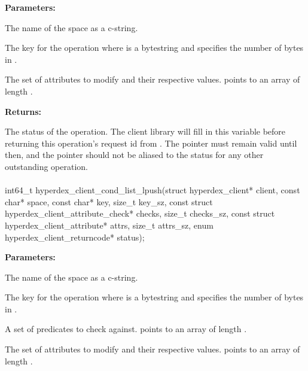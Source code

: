\noindent\textbf{Parameters:}
\begin{description}[labelindent=\widthof{{\code{attrs}, \code{attrs\_sz}}},leftmargin=*,noitemsep,nolistsep,align=right]
\item[\code{space}] The name of the space as a c-string.
\item[\code{key}, \code{key\_sz}] The key for the operation where  is a bytestring and  specifies the number of bytes in .
\item[\code{attrs}, \code{attrs\_sz}] The set of attributes to modify and their respective values.   points to an array of length .
\end{description}

\noindent\textbf{Returns:}
\begin{description}[labelindent=\widthof{{\code{status}}},leftmargin=*,noitemsep,nolistsep,align=right]
\item[\code{status}] The status of the operation.  The client library will fill in this variable before returning this operation's request id from .  The pointer must remain valid until then, and the pointer should not be aliased to the status for any other outstanding operation.
\end{description}

\paragraph{}
\label{api:c:cond_list_lpush}
\begin{ccode}
int64_t hyperdex_client_cond_list_lpush(struct hyperdex_client* client,
        const char* space,
        const char* key, size_t key_sz,
        const struct hyperdex_client_attribute_check* checks, size_t checks_sz,
        const struct hyperdex_client_attribute* attrs, size_t attrs_sz,
        enum hyperdex_client_returncode* status);
\end{ccode}
\funcdesc 

\noindent\textbf{Parameters:}
\begin{description}[labelindent=\widthof{{\code{checks}, \code{checks\_sz}}},leftmargin=*,noitemsep,nolistsep,align=right]
\item[\code{space}] The name of the space as a c-string.
\item[\code{key}, \code{key\_sz}] The key for the operation where  is a bytestring and  specifies the number of bytes in .
\item[\code{checks}, \code{checks\_sz}] A set of predicates to check against.   points to an array of length .
\item[\code{attrs}, \code{attrs\_sz}] The set of attributes to modify and their respective values.   points to an array of length .
\end{description}

